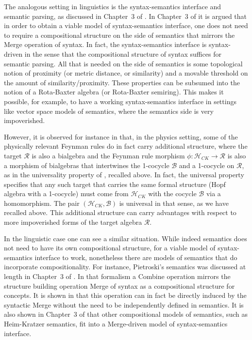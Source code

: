 \documentclass[12pt]{amsart}
\numberwithin{equation}{section}
\def\cB{{\mathcal B}}
\def\cH{{\mathcal H}}
\def\cR{{\mathcal R}}
\begin{document}
The analogous setting in linguistics is the syntax-semantics interface and 
semantic parsing, as discussed in Chapter~3 of \cite{MCB}. 
In Chapter~3 of \cite{MCB} it is argued that in order to obtain a viable model of syntax-semantics
interface, one does not need to require a compositional structure on the side of semantics that
mirrors the Merge operation of syntax. In fact, the syntax-semantics interface is syntax-driven
in the sense that the compositional structure of syntax suffices for semantic parsing. All that
is needed on the side of semantics is some topological notion of proximity (or metric
distance, or similarity) and a movable threshold on the amount of similarity/proximity.
These properties can be subsumed into the notion of a Rota-Baxter algebra (or Rota-Baxter 
semiring). This makes it possible, for example, to have a working syntax-semantics interface
in settings like vector space models of semantics, where the semantics side is very impoverished.

However, it is observed for instance in \cite{Panzer} that, in the physics
setting, some of the physically relevant Feynman rules do in fact carry
additional structure, where the target $\cR$ is also a bialgebra and
the Feynman rule morphism $\phi: \cH_{CK} \to \cR$ is also a morphism of
bialgebras that intertwines the 1-cocycle $\cB$ and a 1-cocycle on $\cR$,
as in the universality property of \cite{Foissy}, recalled above. In fact, the
universal property specifies that any such target that carries the same
formal structure (Hopf algebra with a 1-cocycle) must come from $\cH_{CK}$
with the cocycle $\cB$ via a homomorphism. The pair $(\cH_{CK},\cB)$ is
universal in that sense, as we have recalled above. This additional structure
can carry advantages with respect to more impoverished forms of the target algebra $\cR$.

In the linguistic case one can see a similar situation. 
While indeed semantics does not need to have its own compositional structure, for a
viable model of syntax-semantics interface to work, nonetheless there are models of 
semantics that do incorporate compositionality.  For instance, Pietroski's semantics was
discussed at length in Chapter~3 of \cite{MCB}. In that formalism a Combine operation
mirrors the structure building operation Merge of syntax as a compositional structure
for concepts. It is shown in \cite{MCB} that this operation can in fact be directly induced
by the syntactic Merge without the need to be independently defined in semantics. It is also
shown in Chapter~3 of \cite{MCB} that other compositional models of semantics, such
as Heim-Kratzer semantics, fit into a Merge-driven model of syntax-semantics interface.
\end{document}
